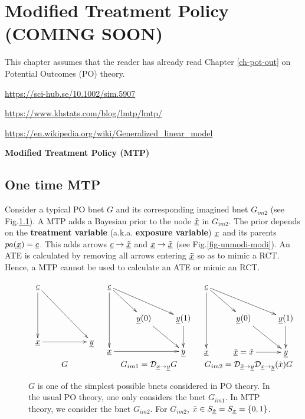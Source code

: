 \chapter{Modified Treatment Policy (COMING SOON)}
\label{ch-modi-treat}

This  chapter
assumes that the
reader has
already read
Chapter \ref{ch-pot-out} on Potential Outcomes (PO) theory.


\url{https://sci-hub.se/10.1002/sim.5907}

\url{https://www.khstats.com/blog/lmtp/lmtp/}

\url{https://en.wikipedia.org/wiki/Generalized_linear_model}


\cite{hernan-book}

{\bf Modified Treatment Policy (MTP)}

\section{One time MTP}
Consider a typical PO bnet $G$
and its corresponding imagined bnet $G_{im2}$ (see Fig.\ref{fig-modi-po}).
A MTP adds a Bayesian prior to the
 node $\underline{{\tilde{x}}}$ in $G_{im2}$.
The prior depends on the {\bf treatment
variable} (a.k.a. {\bf exposure variable}) ${\underline{x}}$ and its parents $pa({\underline{x}})={\underline{c}}$.
This adds arrows ${\underline{c}}\rightarrow\underline{{\tilde{x}}}$
and ${\underline{x}}\rightarrow \underline{{\tilde{x}}}$ (see Fig.\ref{fig-unmodi-modi}).
An ATE is calculated by removing all arrows entering $\underline{{\tilde{x}}}$
so as to mimic a RCT. Hence, a MTP cannot be used to calculate
an ATE or mimic an RCT.


\begin{figure}[h!]
$$
\begin{array}{ccc}
\xymatrix{
\rvc
\ar[dd]\ar[ddrr]
\\
\\
\rvx \ar[rr]
&
&\rvy
}
&
\xymatrix{
\rvc
\ar[dd]\ar[dr] \ar[drr]
\\
& \rvy(0)\ar[dr]
&\rvy(1)\ar[d]
\\
\rvx\ar[rr]
&
&\rvy
}
&
\xymatrix{
\rvc
\ar[dd]\ar[dr] \ar[drr]
\\
& \rvy(0)\ar[dr]
&\rvy(1)\ar[d]
\\
\rvx
&\ul{\tilx}=\tilx\ar[r]
&\rvy
}
\\
G
&G_{im1} =\cald_{\rvx\rarrow\rvy} G
& G_{im2}=\cald_{\ul{\tilx}\rarrow\rvy}\cald_{\rvx\rarrow\rvy}(\tilx)G
\end{array}
$$
\caption{$G$ is one of the
simplest possible bnets considered in  PO theory.
In the usual PO theory,
one only considers the bnet $G_{im1}$.
In MTP theory, we
consider the bnet $G_{im2}$.
For $G_{im2}$, ${\tilde{x}}\in S_{\underline{{\tilde{x}}}}=S_{\underline{x}}=\{0,1\}$.
}
\label{fig-modi-po}
\end{figure}


